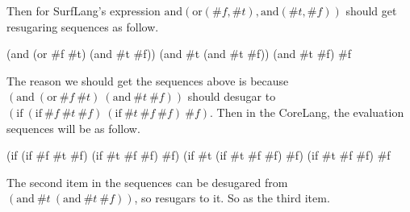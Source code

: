 Then for SurfLang's expression $\mbox{and}(\mbox{or}(\#f, \#t), \mbox{and}(\#t, \#f))$ should get resugaring sequences as follow.

\begin{Codes}
    (and (or \#f \#t) (and \#t \#f))
\CoreStep (and \#t (and \#t \#f))
\CoreStep (and \#t \#f)
\CoreStep \#f
\end{Codes}

The reason we should get the sequences above is because $(\mbox{and}~(\mbox{or}~\#f~\#t)~(\mbox{and}~\#t~\#f))$ should desugar to $(\mbox{if}~(\mbox{if}~\#f~\#t~\#f)~(\mbox{if}~\#t~\#f~\#f)~\#f)$. Then in the CoreLang, the evaluation sequences will be as follow.
\begin{Codes}
    (if (if \#f \#t \#f) (if \#t \#f \#f) \#f)
\CoreStep (if \#t (if \#t \#f \#f) \#f)
\CoreStep (if \#t \#f \#f)
\CoreStep \#f
\end{Codes}

The second item in the sequences can be desugared from $(\mbox{and}~\#t~(\mbox{and}~\#t~\#f))$, so resugars to it. So as the third item.

